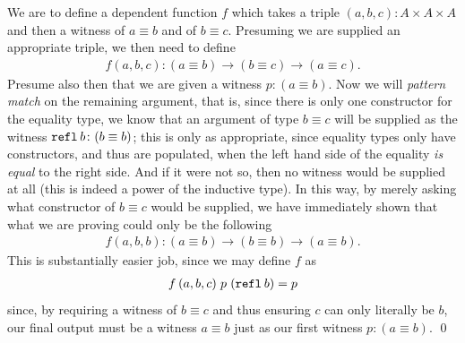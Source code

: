 \documentclass[11pt]{article}
\begin{document}
\begin{my proof}{}
We are to define a dependent function $f$ which takes a triple $(a,b,c) \colon A \times A \times A$ and then a witness of $a \equiv b$ and of $b \equiv c$. Presuming we are supplied an appropriate triple, we then need to define \begin{gather*}
f(a,b,c) \colon (a \equiv b) \to (b \equiv c) \to (a \equiv c).
\end{gather*}
Presume also then that we are given a witness $p \colon (a \equiv b)$. Now we will \emph{pattern match} on the remaining argument, that is, since there is only one constructor for the equality type, we know that an argument of type $b \equiv c$ will be supplied as the witness $\mathtt{refl} \hspace{0.2em} b \colon (b \equiv b)$; this is only as appropriate, since equality types only have constructors, and thus are populated, when the left hand side of the equality \emph{is equal} to the right side. And if it were not so, then no witness would be supplied at all (this is indeed a power of the inductive type). In this way, by merely asking what constructor of $b \equiv c$ would be supplied, we have immediately shown that what we are proving could only be the following\begin{gather*}
f(a,b,b) \colon (a \equiv b) \to (b \equiv b) \to (a \equiv b).
\end{gather*}
This is substantially easier job, since we may define $f$ as \begin{gather*}
f\hspace{0.2em} (a,b,c) \hspace{0.3em} p \hspace{0.3em} (\mathtt{refl} \hspace{0.2em} b) = p
\end{gather*}
since, by requiring a witness of $b \equiv c$ and thus ensuring $c$ can only literally be $b$, our final output must be a witness $a \equiv b$ just as our first witness $p \colon (a \equiv b)$. \qed
\end{my proof}
\end{document}
